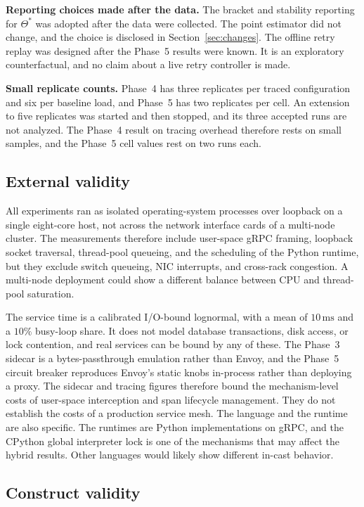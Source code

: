 \textbf{Reporting choices made after the data.} The bracket and stability reporting for $\Theta^*$ was adopted after the data were collected. The point estimator did not change, and the choice is disclosed in Section~\ref{sec:changes}. The offline retry replay was designed after the Phase~5 results were known. It is an exploratory counterfactual, and no claim about a live retry controller is made.

\textbf{Small replicate counts.} Phase~4 has three replicates per traced configuration and six per baseline load, and Phase~5 has two replicates per cell. An extension to five replicates was started and then stopped, and its three accepted runs are not analyzed. The Phase~4 result on tracing overhead therefore rests on small samples, and the Phase~5 cell values rest on two runs each.

\subsection{External validity}

All experiments ran as isolated operating-system processes over loopback on a single eight-core host, not across the network interface cards of a multi-node cluster. The measurements therefore include user-space gRPC framing, loopback socket traversal, thread-pool queueing, and the scheduling of the Python runtime, but they exclude switch queueing, NIC interrupts, and cross-rack congestion. A multi-node deployment could show a different balance between CPU and thread-pool saturation.

The service time is a calibrated I/O-bound lognormal, with a mean of $10\,\mathrm{ms}$ and a $10\%$ busy-loop share. It does not model database transactions, disk access, or lock contention, and real services can be bound by any of these. The Phase~3 sidecar is a bytes-passthrough emulation rather than Envoy, and the Phase~5 circuit breaker reproduces Envoy's static knobs in-process rather than deploying a proxy. The sidecar and tracing figures therefore bound the mechanism-level costs of user-space interception and span lifecycle management. They do not establish the costs of a production service mesh. The language and the runtime are also specific. The runtimes are Python implementations on gRPC, and the CPython global interpreter lock is one of the mechanisms that may affect the hybrid results. Other languages would likely show different in-cast behavior.

\subsection{Construct validity}

